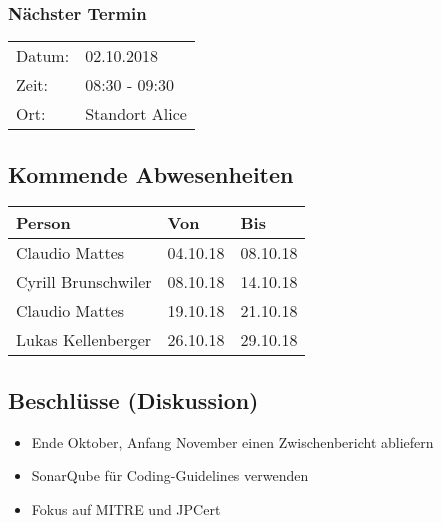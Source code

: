\subsubsection*{Nächster Termin}

\begin{tabular}{p{4cm} p{12cm}}
    Datum: & 02.10.2018 \\
    Zeit: & 08:30 - 09:30 \\
    Ort: & Standort Alice \\
\end{tabular}

\subsection*{Kommende Abwesenheiten}
\begin{table}[H]
    \centering
    \begin{tabular}{p{6cm} p{5cm} p{5cm}}
        \textbf{Person} & \textbf{Von} & \textbf{Bis} \\ \hline
        Claudio Mattes & 04.10.18 & 08.10.18 \\ \hline
        Cyrill Brunschwiler & 08.10.18 & 14.10.18 \\ \hline
        Claudio Mattes & 19.10.18 & 21.10.18 \\ \hline
        Lukas Kellenberger & 26.10.18 & 29.10.18 \\ \hline
    \end{tabular}
\end{table}

\subsection*{Beschlüsse (Diskussion)}
\begin{itemize}
    \item Ende Oktober, Anfang November einen Zwischenbericht abliefern
    \item SonarQube für Coding-Guidelines verwenden
    \item Fokus auf MITRE und JPCert
\end{itemize}

